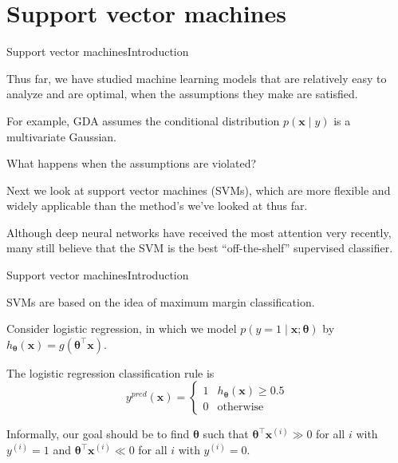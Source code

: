 \documentclass{beamer}
\renewcommand{\vec}[1]{\boldsymbol{#1}}
\begin{document}
\section{Support vector machines}

\begin{frame}{Support vector machines}{Introduction}

  Thus far, we have studied machine learning models that are
  relatively easy to analyze and are \alert{optimal}, when the \alert{assumptions} they
  make are \alert{satisfied}.

  \medskip

  For example, GDA assumes the conditional distribution $p(\vec{x} \mid y)$ is
  a multivariate Gaussian.
  
  \medskip

  What happens when the assumptions are violated?

  \medskip

  Next we look at \alert{support vector machines (SVMs)}, which are more
  flexible and widely applicable than the method's we've looked at
  thus far.

  \medskip

  Although deep neural networks have received the most attention very
  recently, many still believe that the SVM is the best
  ``off-the-shelf'' supervised classifier.
  
\end{frame}


\begin{frame}{Support vector machines}{Introduction}

  SVMs are based on the idea of \alert{maximum margin} classification.

  \medskip

  Consider logistic regression, in which we model $p(y=1 \mid \vec{x}
  ; \vec{\theta})$ by $h_{\vec{\theta}}(\vec{x}) = g(\vec{\theta}^\top
  \vec{x})$.

  \medskip

  The logistic regression classification rule is
  \[ y^{pred}(\vec{x}) = \begin{cases} 1 & h_{\vec{\theta}}(\vec{x}) \ge 0.5 \\
    0 & \text{otherwise} \end{cases} \]

  Informally, our goal should be to find
  $\vec{\theta}$ such that
  $\vec{\theta}^\top \vec{x}^{(i)} \gg 0$ for all $i$ with $y^{(i)} = 1$ and
  $\vec{\theta}^\top \vec{x}^{(i)} \ll 0$ for all $i$ with $y^{(i)} = 0$.
  
\end{frame}
\end{document}
